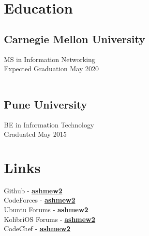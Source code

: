 \documentclass[]{deedy-resume-openfont}
\begin{document}
%
%
\lastupdated

%
%
\lastupdated %

%
%

\begin{minipage}[t]{0.33\textwidth} 


\section{Education}

\subsection[Carnegie Mellon University]{Carnegie Mellon \newline University}
MS in Information Networking \\
Expected Graduation May 2020 \\
\  \\ %

\subsection{Pune University}
BE in Information Technology \\
Graduated May 2015 \\
\sectionsep %

\section{Links} 
Github - \href{https://github.com/ashmew2}{\bf ashmew2} \\
CodeForces - \href{http://codeforces.com/profile/ashmew2}{\bf ashmew2} \\
Ubuntu Forums - \href{http://ubuntuforums.org/showthread.php?t=821461} {\bf ashmew2} \\
KolibriOS Forums - \href{http://board.kolibrios.org/memberlist.php?mode=viewprofile&u=6211} {\bf ashmew2} \\
CodeChef - \href{http://www.codechef.com/users/ashmew2}{\bf ashmew2} \\


\end{minipage}
\end{document}
